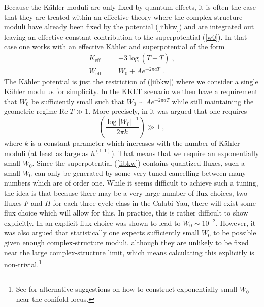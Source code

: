 \documentclass[11pt,a4paper]{article}
\numberwithin{equation}{section}
\numberwithin{table}{section}\setlength{\multlinegap}{25pt}
\newcommand{\bea}{\begin{eqnarray}}  \newcommand{\eea}{\end{eqnarray}}
\newcommand{\nn}{\nonumber}
\newcommand{\be}{\begin{equation}}
\newcommand{\ee}{\end{equation}}
\begin{document}
Because the K{\"a}hler moduli are only fixed by quantum effects, it is often the case that they are treated within an effective theory where the complex-structure moduli have already been fixed by the potential (\ref{iibkw}) and are integrated out leaving an effective constant contribution to the superpotential (\ref{w0}). In that case one works with an effective K{\"a}hler and superpotential of the form
\bea
\label{kkltwef}
K _{\mathrm{eff}} &=& - 3\log \left(T + \overline{T}  \right) \;, \nn \\
W_{\mathrm{eff}} &=& W_0 + Ae^{-2\pi a T} \;.
\eea
The K{\"a}hler potential is just the restriction of (\ref{iibkw}) where we consider a single K{\"a}hler modulus for simplicity. In the KKLT scenario we then have a requirement that $W_0$ be sufficiently small such that $W_0 \sim Ae^{-2\pi a T}$ while still maintaining the geometric regime $\mathrm{Re\;}T \gg 1$. More precisely, in \cite{Denef:2004dm} it was argued that one requires
\be
\left( \frac{\log \left|W_0\right|^{-1}}{2\pi k} \right) \gg 1\;,
\ee
where $k$ is a constant parameter which increases with the number of K{\"a}hler moduli (at least as large as $h^{(1,1)}$). 
That means that we require an exponentially small $W_0$. Since the superpotential (\ref{iibkw}) contains quantized fluxes, such a small $W_0$ can only be generated by some very tuned cancelling between many numbers which are of order one. While it seems difficult to achieve such a tuning, the idea is that because there may be a very large number of flux choices, two fluxes $F$ and $H$ for each three-cycle class in the Calabi-Yau, there will exist some flux choice which will allow for this. In practice, this is rather difficult to show explicitly. In \cite{Denef:2004dm} an explicit flux choice was shown to lead to $W_0 \sim 10^{-2}$. However, it was also argued that statistically one expects sufficiently small $W_0$ to be possible given enough complex-structure moduli, although they are unlikely to be fixed near the large complex-structure limit, which means calculating this explicitly is non-trivial.\footnote{See \cite{Blumenhagen:2016bfp,Wolf:2017wmu,Blumenhagen:2019qcg} for alternative suggestions on how to construct exponentially small $W_0$ near the conifold locus.}
\end{document}
